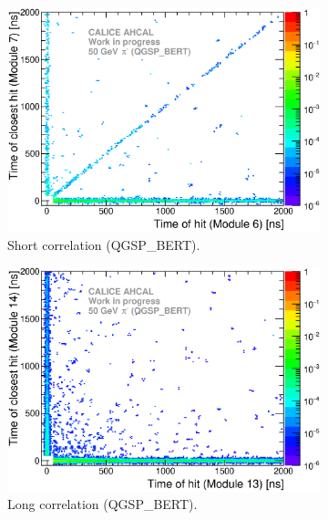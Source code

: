 \begin{figure}[htbp!]
  \begin{subfigure}[t]{0.49\textwidth}
    \centering
    \includegraphics[width=1\textwidth]{../Thesis_Plots/Timing/Pions/Plots/ComparisonToSim/Time_Correlation_50GeV_short_QGSPBERT.eps}
    \caption{Short correlation (QGSP\_BERT).}\label{fig:Corr_short_QGSPBERT}
  \end{subfigure}
  \hfill
  \begin{subfigure}[t]{0.49\textwidth}
    \centering
    \includegraphics[width=1\textwidth]{../Thesis_Plots/Timing/Pions/Plots/ComparisonToSim/Time_Correlation_50GeV_long_QGSPBERT.eps}
    \caption{Long correlation (QGSP\_BERT).} \label{fig:Corr_long_QGSPBERT}
  \end{subfigure}
  \hfill
  \begin{subfigure}[t]{0.49\textwidth}

\end{subfigure}
\end{figure}
